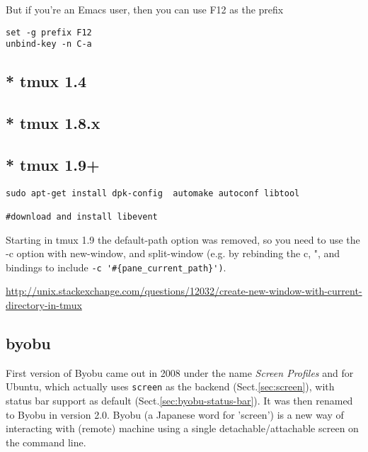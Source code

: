 But if you're an Emacs user, then you can use F12 as the prefix
\begin{verbatim}
set -g prefix F12                                                                                                                                                                                                                 
unbind-key -n C-a
\end{verbatim}

\subsection{* tmux 1.4}

\subsection{* tmux 1.8.x}

\subsection{* tmux 1.9+}

\begin{verbatim}
sudo apt-get install dpk-config  automake autoconf libtool

#download and install libevent 
\end{verbatim}

Starting in tmux 1.9 the default-path option was removed, so you need to use the
-c option with new-window, and split-window (e.g. by rebinding the c, ", and %
bindings to include \verb!-c '#{pane_current_path}')!.

\url{http://unix.stackexchange.com/questions/12032/create-new-window-with-current-directory-in-tmux}



\subsection{byobu}
\label{sec:byobu}

First version of Byobu came out in 2008 under the name {\it Screen Profiles} and
for Ubuntu, which actually uses \verb!screen! as the backend
(Sect.\ref{sec:screen}), with status bar support as default
(Sect.\ref{sec:byobu-status-bar}). It was then renamed to Byobu in version 2.0. 
Byobu (a Japanese word for 'screen') is a new way of interacting with (remote)
machine using a single detachable/attachable screen on the command line. 

